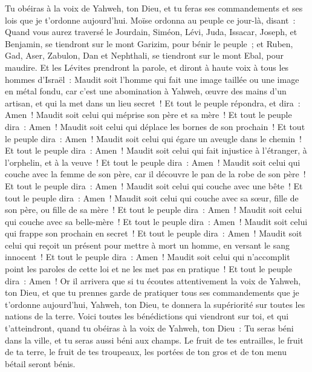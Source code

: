 \begin{multicols}{2}
Tu obéiras à la voix de Yahweh, ton Dieu, et tu feras ses commandements et ses lois que je t'ordonne aujourd'hui.
Moïse ordonna au peuple ce jour-là, disant~:
Quand vous aurez traversé le Jourdain, Siméon, Lévi, Juda, Issacar, Joseph, et Benjamin, se tiendront sur le mont Garizim, pour bénir le peuple~;
et Ruben, Gad, Aser, Zabulon, Dan et Nephthali, se tiendront sur le mont Ebal, pour maudire.
Et les Lévites prendront la parole, et diront à haute voix à tous les hommes d'Israël~:
Maudit soit l'homme qui fait une image taillée ou une image en métal fondu, car c'est une abomination à Yahweh, œuvre des mains d'un artisan, et qui la met dans un lieu secret~! Et tout le peuple répondra, et dira~: Amen~!
Maudit soit celui qui méprise son père et sa mère~! Et tout le peuple dira~: Amen~!
Maudit soit celui qui déplace les bornes de son prochain~! Et tout le peuple dira~: Amen~!
Maudit soit celui qui égare un aveugle dans le chemin~! Et tout le peuple dira~: Amen~!
Maudit soit celui qui fait injustice à l'étranger, à l'orphelin, et à la veuve~! Et tout le peuple dira~: Amen~!
Maudit soit celui qui couche avec la femme de son père, car il découvre le pan de la robe de son père~! Et tout le peuple dira~: Amen~!
Maudit soit celui qui couche avec une bête~! Et tout le peuple dira~: Amen~!
Maudit soit celui qui couche avec sa sœur, fille de son père, ou fille de sa mère~! Et tout le peuple dira~: Amen~!
Maudit soit celui qui couche avec sa belle-mère~! Et tout le peuple dira~: Amen~!
Maudit soit celui qui frappe son prochain en secret~! Et tout le peuple dira~: Amen~!
Maudit soit celui qui reçoit un présent pour mettre à mort un homme, en versant le sang innocent~! Et tout le peuple dira~: Amen~!
Maudit soit celui qui n'accomplit point les paroles de cette loi et ne les met pas en pratique~! Et tout le peuple dira~: Amen~!
\VerseOne{}Or il arrivera que si tu écoutes attentivement la voix de Yahweh, ton Dieu, et que tu prennes garde de pratiquer tous ses commandements que je t'ordonne aujourd'hui, Yahweh, ton Dieu, te donnera la supériorité sur toutes les nations de la terre.
Voici toutes les bénédictions qui viendront sur toi, et qui t'atteindront, quand tu obéiras à la voix de Yahweh, ton Dieu~:
Tu seras béni dans la ville, et tu seras aussi béni aux champs.
Le fruit de tes entrailles, le fruit de ta terre, le fruit de tes troupeaux, les portées de ton gros et de ton menu bétail seront bénis.

\end{multicols}
